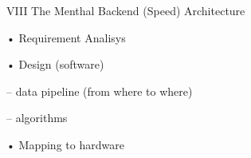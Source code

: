 VIII The Menthal Backend (Speed) Architecture

• Requirement Analisys

• Design (software)

– data pipeline (from where to where)

– algorithms

• Mapping to hardware